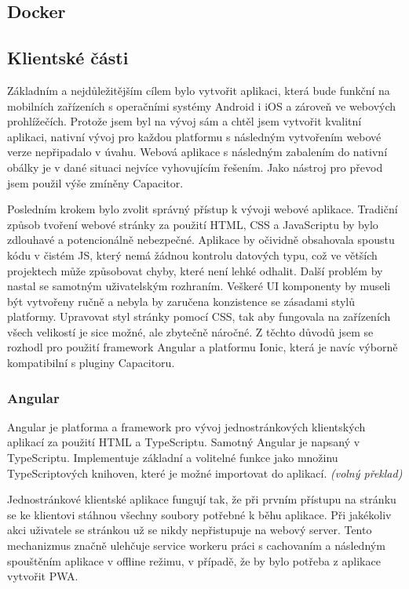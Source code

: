 \documentclass[
  biblatex,
  glossaries,
  index
]{kidiplom}
\begin{document}
\subsection{Docker}
 
\subsection{Klientské části}
Základním a nejdůležitějším cílem bylo vytvořit aplikaci, která bude funkční na mobilních zařízeních s operačními systémy Android i iOS a zároveň ve webových prohlížečích. Protože jsem byl na vývoj sám a chtěl jsem vytvořit kvalitní aplikaci, nativní vývoj pro každou platformu s následným vytvořením webové verze nepřipadalo v úvahu. Webová aplikace s následným zabalením do nativní obálky je v dané situaci nejvíce vyhovujícím řešením. Jako nástroj pro převod jsem použil výše zmíněny Capacitor. 

Posledním krokem bylo zvolit správný přístup k vývoji webové aplikace. Tradiční způsob tvoření webové stránky za použití HTML, CSS a JavaScriptu by bylo zdlouhavé a potencionálně nebezpečné. Aplikace by očividně obsahovala spoustu kódu v čistém JS, který nemá žádnou kontrolu datových typu, což ve větších projektech může způsobovat chyby, které není lehké odhalit. Další problém by nastal se samotným uživatelským rozhraním. Veškeré UI komponenty by museli být vytvořeny ručně a nebyla by zaručena konzistence se zásadami stylů platformy. Upravovat styl stránky pomocí CSS, tak aby fungovala na zařízeních všech velikostí je sice možné, ale zbytečně náročné. Z těchto důvodů jsem se rozhodl pro použití framework Angular a platformu Ionic, která je navíc výborně kompatibilní s pluginy Capacitoru.

\subsubsection{Angular}
Angular je platforma a framework pro vývoj jednostránkových klientských aplikací za použití HTML a TypeScriptu. Samotný Angular je napsaný v TypeScriptu. Implementuje základní a volitelné funkce jako množinu TypeScriptových knihoven, které je možné importovat do aplikací. \cite{8} \textit{(volný překlad)} 

Jednostránkové klientské aplikace fungují tak, že při prvním přístupu na stránku se ke klientovi stáhnou všechny soubory potřebné k běhu aplikace. Při jakékoliv akci uživatele se stránkou už se nikdy nepřistupuje na webový server. Tento mechanizmus značně ulehčuje service workeru práci s cachovaním a následným spouštěním aplikace v offline režimu, v případě, že by bylo potřeba z aplikace vytvořit PWA.
\end{document}
